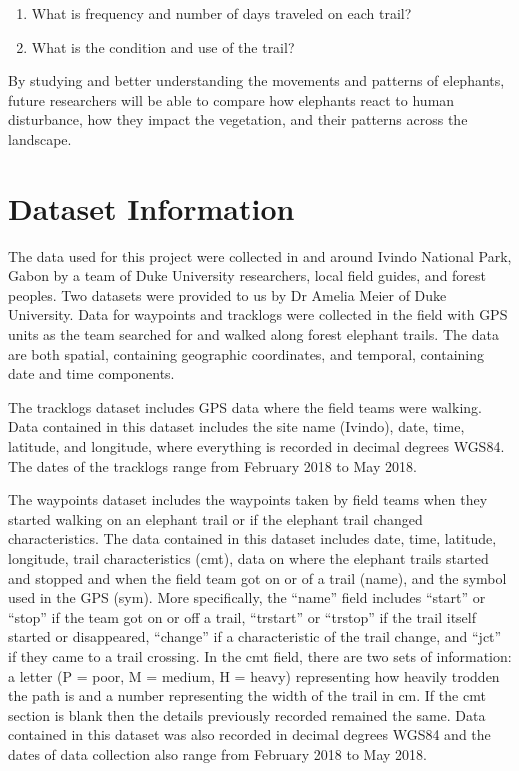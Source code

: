 \documentclass[12pt,]{article}
\providecommand{\tightlist}{%
  \setlength{\itemsep}{0pt}\setlength{\parskip}{0pt}}
\begin{document}
\begin{enumerate}
\def\labelenumi{\arabic{enumi}.}
\tightlist
\item
  What is frequency and number of days traveled on each trail?
\item
  What is the condition and use of the trail?
\end{enumerate}

By studying and better understanding the movements and patterns of
elephants, future researchers will be able to compare how elephants
react to human disturbance, how they impact the vegetation, and their
patterns across the landscape.

\newpage

\hypertarget{dataset-information}{%
\section{Dataset Information}\label{dataset-information}}

The data used for this project were collected in and around Ivindo
National Park, Gabon by a team of Duke University researchers, local
field guides, and forest peoples. Two datasets were provided to us by Dr
Amelia Meier of Duke University. Data for waypoints and tracklogs were
collected in the field with GPS units as the team searched for and
walked along forest elephant trails. The data are both spatial,
containing geographic coordinates, and temporal, containing date and
time components.

The tracklogs dataset includes GPS data where the field teams were
walking. Data contained in this dataset includes the site name (Ivindo),
date, time, latitude, and longitude, where everything is recorded in
decimal degrees WGS84. The dates of the tracklogs range from February
2018 to May 2018.

The waypoints dataset includes the waypoints taken by field teams when
they started walking on an elephant trail or if the elephant trail
changed characteristics. The data contained in this dataset includes
date, time, latitude, longitude, trail characteristics (cmt), data on
where the elephant trails started and stopped and when the field team
got on or of a trail (name), and the symbol used in the GPS (sym). More
specifically, the ``name'' field includes ``start'' or ``stop'' if the
team got on or off a trail, ``trstart'' or ``trstop'' if the trail
itself started or disappeared, ``change'' if a characteristic of the
trail change, and ``jct'' if they came to a trail crossing. In the cmt
field, there are two sets of information: a letter (P = poor, M =
medium, H = heavy) representing how heavily trodden the path is and a
number representing the width of the trail in cm. If the cmt section is
blank then the details previously recorded remained the same. Data
contained in this dataset was also recorded in decimal degrees WGS84 and
the dates of data collection also range from February 2018 to May 2018.
\end{document}
